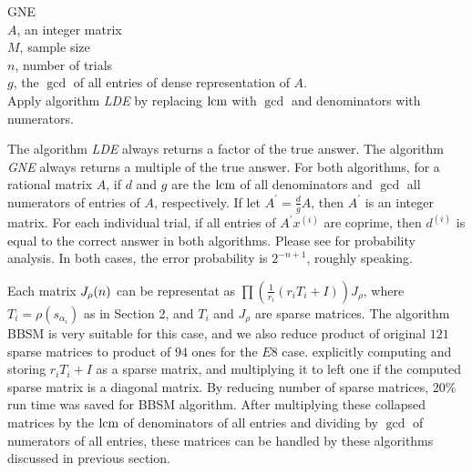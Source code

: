 \begin{algorithm}{GNE}
\Inspec \\
$A$, an integer matrix\\
$M$, sample size\\
$n$, number of trials
\Outspec \\
$g$, the $\gcd$ of all entries of dense representation of $A$.
\Procspec\\
Apply algorithm {\em LDE} by replacing $\mbox{lcm}$ with $\gcd$ and 
denominators with numerators.
\end{algorithm}
The algorithm {\em LDE}
always returns a factor of the true answer.
The algorithm {\em GNE}
always returns a multiple of the true answer.
For both algorithms, for a rational matrix $A$, if 
$d$ and $g$ are the $\mbox{lcm}$ of all denominators 
and $\gcd$ all numerators of entries of $A$, respectively.
If let $A^\prime = \frac{d}{g}A$, then $A^\prime$ is an integer matrix.
For each individual trial,
if all entries of  $A^\prime x^{(i)}$ are coprime,
then $d^{(i)}$ is equal to the correct answer in both algorithms.
Please see \cite{Saunders::LA::2004} for probability analysis. %
In both cases, the error probability is 
$2^{-n + 1}$, roughly speaking.

Each matrix $J_\rho(n)$ can be representat as
$\prod (\frac1{r_i}(r_iT_i +I))J_\rho$, where $T_i=\rho(s_{\alpha_i})$
as in Section 2, and $T_i$ and $J_\rho$ are sparse matrices.
The algorithm BBSM is very suitable for this case, and
we also reduce product of original $121$ sparse matrices 
to product of $94$ ones for the $E8$ case.
explicitly computing and storing $r_i T_i + I$ as a sparse matrix, 
and multiplying it to left one if the computed sparse matrix is a
diagonal matrix. By reducing number of sparse matrices, 
$20\%$ run time was saved for BBSM algorithm. 
After multiplying these collapsed matrices 
by the $\mbox{lcm}$ of denominators of all entries and dividing
by $\gcd$ of numerators of all entries, these matrices can be handled by these
algorithms discussed in previous section.


